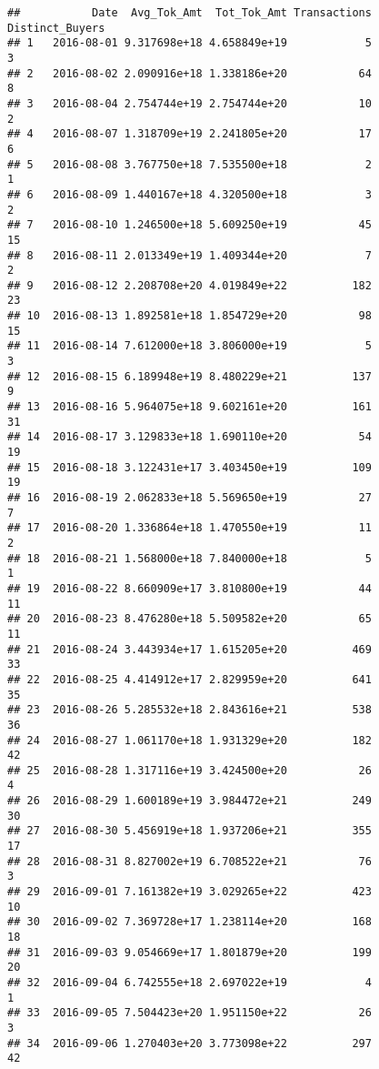 \documentclass[]{article}
\begin{document}
\begin{verbatim}
##           Date  Avg_Tok_Amt  Tot_Tok_Amt Transactions Distinct_Buyers
## 1   2016-08-01 9.317698e+18 4.658849e+19            5               3
## 2   2016-08-02 2.090916e+18 1.338186e+20           64               8
## 3   2016-08-04 2.754744e+19 2.754744e+20           10               2
## 4   2016-08-07 1.318709e+19 2.241805e+20           17               6
## 5   2016-08-08 3.767750e+18 7.535500e+18            2               1
## 6   2016-08-09 1.440167e+18 4.320500e+18            3               2
## 7   2016-08-10 1.246500e+18 5.609250e+19           45              15
## 8   2016-08-11 2.013349e+19 1.409344e+20            7               2
## 9   2016-08-12 2.208708e+20 4.019849e+22          182              23
## 10  2016-08-13 1.892581e+18 1.854729e+20           98              15
## 11  2016-08-14 7.612000e+18 3.806000e+19            5               3
## 12  2016-08-15 6.189948e+19 8.480229e+21          137               9
## 13  2016-08-16 5.964075e+18 9.602161e+20          161              31
## 14  2016-08-17 3.129833e+18 1.690110e+20           54              19
## 15  2016-08-18 3.122431e+17 3.403450e+19          109              19
## 16  2016-08-19 2.062833e+18 5.569650e+19           27               7
## 17  2016-08-20 1.336864e+18 1.470550e+19           11               2
## 18  2016-08-21 1.568000e+18 7.840000e+18            5               1
## 19  2016-08-22 8.660909e+17 3.810800e+19           44              11
## 20  2016-08-23 8.476280e+18 5.509582e+20           65              11
## 21  2016-08-24 3.443934e+17 1.615205e+20          469              33
## 22  2016-08-25 4.414912e+17 2.829959e+20          641              35
## 23  2016-08-26 5.285532e+18 2.843616e+21          538              36
## 24  2016-08-27 1.061170e+18 1.931329e+20          182              42
## 25  2016-08-28 1.317116e+19 3.424500e+20           26               4
## 26  2016-08-29 1.600189e+19 3.984472e+21          249              30
## 27  2016-08-30 5.456919e+18 1.937206e+21          355              17
## 28  2016-08-31 8.827002e+19 6.708522e+21           76               3
## 29  2016-09-01 7.161382e+19 3.029265e+22          423              10
## 30  2016-09-02 7.369728e+17 1.238114e+20          168              18
## 31  2016-09-03 9.054669e+17 1.801879e+20          199              20
## 32  2016-09-04 6.742555e+18 2.697022e+19            4               1
## 33  2016-09-05 7.504423e+20 1.951150e+22           26               3
## 34  2016-09-06 1.270403e+20 3.773098e+22          297              42

\end{verbatim}
\end{document}
